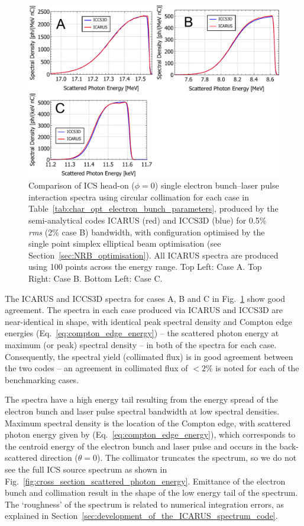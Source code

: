 \documentclass[../main.tex]{subfiles}
\begin{document}
\begin{figure}[!h]
\centering
\includegraphics[width=\textwidth]{Figures/Optimisation_and_Characterisation_of_Inverse_Compton_Scattering_Sources/ICARUS_ICCS3D_cases_comparision.pdf}
\caption{Comparison of ICS head-on ($\phi=0$) single electron bunch--laser pulse interaction spectra using circular collimation for each case in Table~\ref{tab:char_opt_electron_bunch_parameters}, produced by the semi-analytical codes \textsc{ICARUS} (red) and \textsc{ICCS3D} (blue) for 0.5\% \textit{rms} (2\% case B) bandwidth, with configuration optimised by the single point simplex elliptical beam optimisation  (see Section~\ref{sec:NRB_optimisation}). All \textsc{ICARUS} spectra are produced using 100 points across the energy range. Top Left: Case A. Top Right: Case B. Bottom Left: Case C.}
\label{fig:ICARUS_optimised_benchmarking}
\end{figure}

The \textsc{ICARUS} and \textsc{ICCS3D} spectra for cases A, B and C in Fig.~\ref{fig:ICARUS_optimised_benchmarking} show good agreement. The spectra in each case produced via \textsc{ICARUS} and \textsc{ICCS3D} are near-identical in shape, with identical peak spectral density and Compton edge energies (Eq.~\ref{eq:compton_edge_energy}) -- the scattered photon energy at maximum (or peak) spectral density -- in both of the spectra for each case. Consequently, the spectral yield (collimated flux) is in good agreement between the two codes -- an agreement in collimated flux of $< 2\%$ is noted for each of the benchmarking cases.

The spectra have a high energy tail resulting from the energy spread of the electron bunch and laser pulse spectral bandwidth at low spectral densities. Maximum spectral density is the location of the Compton edge, with scattered photon energy given by (Eq.~\ref{eq:compton_edge_energy}), which corresponds to the centroid energy of the electron bunch and laser pulse and occurs in the back-scattered direction ($\theta=0$). The collimator truncates the spectrum, so we do not see the full ICS source spectrum as shown in Fig.~\ref{fig:cross_section_scattered_photon_energy}. Emittance of the electron bunch and collimation result in the shape of the low energy tail of the spectrum. The `roughness' of the spectrum is related to numerical integration errors, as explained in Section~\ref{sec:development_of_the_ICARUS_spectrum_code}.
\end{document}
